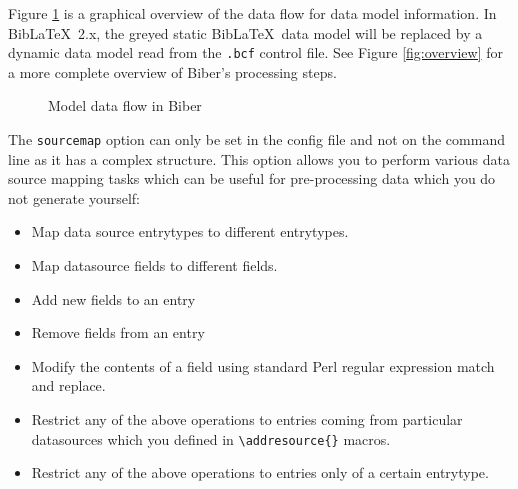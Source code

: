 \documentclass{ltxdockit}
\begin{document}
Figure \ref{fig:biber-mdf} is a graphical overview of the data flow for
data model information. In Bib\LaTeX\ 2.x, the greyed static Bib\LaTeX\
data model will be replaced by a dynamic data model read from the
\verb+.bcf+ control file. See Figure \ref{fig:overview} for a more complete
overview of Biber's processing steps.

\begin{figure}[!htpb]
  \centering\small
  \caption{Model data flow in Biber}
  \label{fig:biber-mdf}
\end{figure}

The \verb+sourcemap+ option can only be set in the config file
and not on the command line as it has a complex structure. This
option allows you to perform various data source mapping
tasks which can be useful for pre-processing data which you do not
generate yourself:

\begin{itemize}
\item Map data source entrytypes to different entrytypes.
\item Map datasource fields to different fields.
\item Add new fields to an entry
\item Remove fields from an entry
\item Modify the contents of a field using standard Perl regular expression
  match and replace.
\item Restrict any of the above operations to entries coming from
  particular datasources which you defined in \verb+\addresource{}+ macros.
\item Restrict any of the above operations to entries only of a certain
  entrytype.
\end{itemize}
\end{document}
